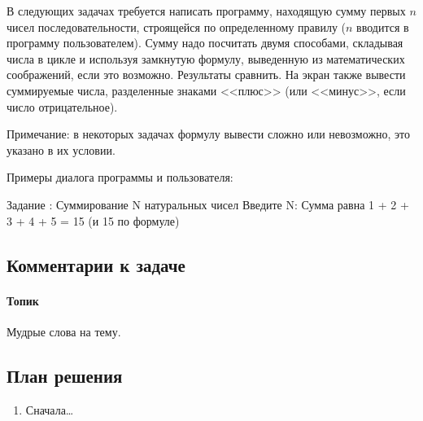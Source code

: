 
В следующих задачах требуется написать программу, находящую сумму первых $n$
чисел последовательности, строящейся по определенному правилу ($n$ вводится в программу
пользователем). Сумму надо посчитать двумя способами, складывая числа в цикле и
используя замкнутую формулу, выведенную из математических соображений, если это возможно. %
Результаты сравнить. На экран также вывести
суммируемые числа, разделенные знаками <<плюс>> (или <<минус>>, если число
отрицательное).

Примечание: в некоторых задачах формулу вывести сложно или невозможно, это
указано в их условии. %

Примеры диалога программы и пользователя:

\begin{zzoutput}
  Задание : Суммирование N натуральных чисел
  Введите N: 
  Сумма равна 1 + 2 + 3 + 4 + 5 = 15 (и 15 по формуле)
\end{zzoutput}


\subsection*{Комментарии к задаче}

\paragraph{Топик}
Мудрые слова на тему.


\subsection*{План решения}


\begin{enumerate}
\item Сначала\dots
\end{enumerate}


